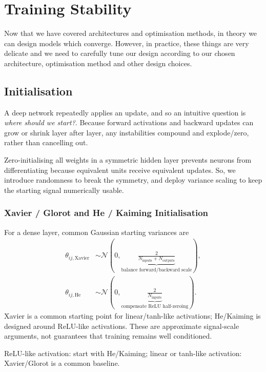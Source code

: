 \chapter{Training Stability}
\label{chap:stability}
Now that we have covered architectures and optimisation methods, in theory we can design models which converge.
However, in practice, these things are very delicate and we need to carefully tune our design according to our chosen architecture, optimisation method and other design choices.

\section{Initialisation}
\label{sec:Initialisation}
A deep network repeatedly applies an update, and so an intuitive question is \textit{where should we start?}.
Because forward activations and backward updates can grow or shrink layer after layer, any instabilities compound and explode/zero, rather than cancelling out.

Zero-initialising all weights in a symmetric hidden layer prevents neurons from differentiating because equivalent units receive equivalent updates.
So, we introduce randomness to break the symmetry, and deploy variance scaling to keep the starting signal numerically usable.

\subsection{Xavier / Glorot and He / Kaiming Initialisation}
\label{sec:stability-xavier-glorot-and-he-kaiming-initialisation}
For a dense layer, common Gaussian starting variances are
\begin{align}
    \theta_{ij,\mathrm{Xavier}}
    &\sim
    \mathcal N\!\left(0,
    \underbrace{\frac{2}{N_{\text{inputs}}+N_{\text{outputs}}}}_{\text{balance forward/backward scale}}
    \right),\\
    \theta_{ij,\mathrm{He}}
    &\sim
    \mathcal N\!\left(0,
    \underbrace{\frac{2}{N_{\text{inputs}}}}_{\text{compensate ReLU half-zeroing}}
    \right).
\end{align}
Xavier is a common starting point for linear/tanh-like activations; He/Kaiming is designed around ReLU-like activations.
These are approximate signal-scale arguments, not guarantees that training remains well conditioned.

\begin{calloutpractical}
    ReLU-like activation: start with He/Kaiming; linear or tanh-like activation: Xavier/Glorot is a common baseline.
\end{calloutpractical}

